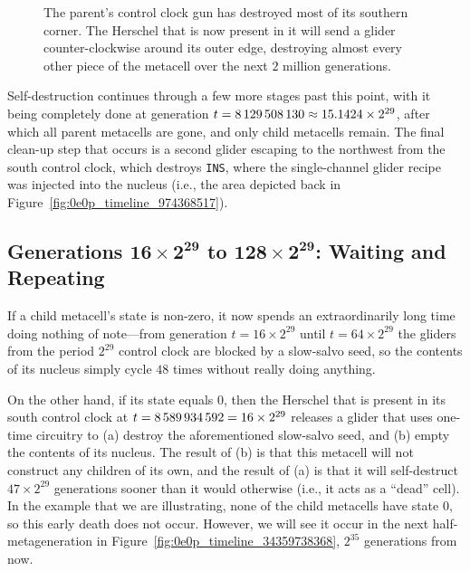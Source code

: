 \begin{figure}[!htb]
	\centering
	\caption{The parent's control clock gun has destroyed most of its southern corner. The Herschel that is now present in it will send a glider counter-clockwise around its outer edge, destroying almost every other piece of the metacell over the next $2$ million generations.}
	\label{fig:0e0p_timeline_8124366848}
\end{figure}

Self-destruction continues through a few more stages past this point, with it being completely done at generation $t = 8{\,}129{\,}508{\,}130 \approx 15.1424 \times 2^{29}$, after which all parent metacells are gone, and only child metacells remain. The final clean-up step that occurs is a second glider escaping to the northwest from the south control clock, which destroys \texttt{INS}, where the single-channel glider recipe was injected into the nucleus (i.e., the area depicted back in Figure~\ref{fig:0e0p_timeline_974368517}).


\subsection{Generations $\mathbf{16 \times 2^{29}}$ to $\mathbf{128 \times 2^{29}}$: Waiting and Repeating}\label{sec:0e0p_timeline_wait_repeat}

If a child metacell's state is non-zero, it now spends an extraordinarily long time doing nothing of note---from generation $t = 16 \times 2^{29}$ until $t = 64 \times 2^{29}$ the gliders from the period $2^{29}$ control clock are blocked by a slow-salvo seed, so the contents of its nucleus simply cycle $48$ times without really doing anything.

On the other hand, if its state equals $0$, then the Herschel that is present in its south control clock at $t = 8{\,}589{\,}934{\,}592 = 16 \times 2^{29}$ releases a glider that uses one-time circuitry to (a) destroy the aforementioned slow-salvo seed, and (b) empty the contents of its nucleus. The result of (b) is that this metacell will not construct any children of its own, and the result of (a) is that it will self-destruct $47 \times 2^{29}$ generations sooner than it would otherwise (i.e., it acts as a ``dead'' cell). In the example that we are illustrating, none of the child metacells have state $0$, so this early death does not occur. However, we will see it occur in the next half-metageneration in Figure~\ref{fig:0e0p_timeline_34359738368}, $2^{35}$ generations from now.

